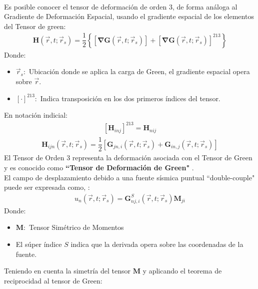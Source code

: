 \begin{frame}[allowframebreaks]
\begin{align*}
\end{align*}
%
Es posible conocer el tensor de deformación de orden $3$, de forma análoga al Gradiente de Deformación Espacial, usando el gradiente espacial de los elementos del Tensor de green:
%
\begin{align*}
	\mathbf{H} \left( \vec{r}, t;\vec{r}_s \right) = \dfrac{1}{2} \left\lbrace \left[ \mathbf{\nabla G} \left(\vec{r}, t; \vec{r}_s \right) \right] + \left[ \mathbf{\nabla G} \left( \vec{r}, t; \vec{r}_s \right) \right]^{213} \right\rbrace
\end{align*}
%
Donde:
%
\begin{itemize}
%
	\justifying
	\item $\vec{r}_s:$ Ubicación donde se aplica la carga de Green, el gradiente espacial opera sobre $\vec{r}$.
	\item $\left[  \cdot \right]^{213}:$ Indica transposición en los dos primeros índices del tensor.
%
\end{itemize}
%
En notación indicial:
%
\begin{align*}
\left[ \mathbf{H}_{inj} \right]^{213} = \mathbf{H}_{nij}
\end{align*}
%
\begin{align*}
	\mathbf{H}_{ijn} \left( \vec{r}, t; \vec{r}_s \right) = \dfrac{1}{2} \left[ \mathbf{G}_{jn,i} \left( \vec{r}, t; \vec{r}_s \right) + \mathbf{G}_{in,j} \left( \vec{r}, t; \vec{r}_s \right) \right]
\end{align*}
%
\justifying
El Tensor de Orden $3$ representa la deformación asociada con el Tensor de Green y es conocido como \textbf{``Tensor de Deformación de Green"} \cite{zhaogreen}.\\
%
El campo de desplazamiento debido a una fuente sísmica puntual ``double-couple" puede ser expresada como, \cite{book:aki}:
%
\begin{align*}
	u_n \left( \vec{r}, t; \vec{r}_s \right) = \mathbf{G}_{nj,i}^S \left( \vec{r}, t; \vec{r}_s \right) \mathbf{M}_{ji}
\end{align*}
%
Donde:
%
\begin{itemize}
	\justifying
	\item $\mathbf{M}:$ Tensor Simétrico de Momentos
	\item El súper índice $S$ indica que la derivada opera sobre las coordenadas de la fuente.
\end{itemize}
%
\justifying
Teniendo en cuenta la simetría del tensor $\mathbf{M}$ y aplicando el teorema de reciprocidad al tensor de Green:
%
\begin{align*}

\end{align*}
\end{frame}
